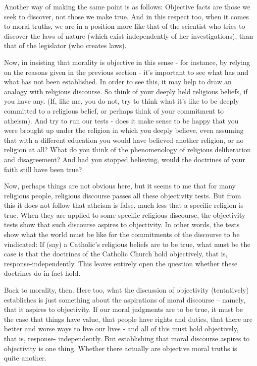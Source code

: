Another way of making the same point is as follows: Objective facts are those we 
seek to discover, not those we make true. And in this respect too, when it comes to 
moral truths, we are in a position more like that of the scientist who tries to discover the 
laws of nature (which exist independently of her investigations), than that of the 
legislator (who creates laws).  

Now, in insisting that morality is objective in this sense - for instance, by relying 
on the reasons given in the previous section - it's important to see what has and what 
has not been established. In order to see this, it may help to draw an analogy with 
religious discourse. So think of your deeply held religious beliefs, if you have any. (If, like 
me, you do not, try to think what it's like to be deeply committed to a religious belief, or 
perhaps think of your commitment to atheism). And try to run our tests - does it make
sense to be happy that you were brought up under the religion in which you deeply 
believe, even assuming that with a different education you would have believed another 
religion, or no religion at all?  What do you think of the phenomenology of religious 
deliberation and disagreement? And had you stopped believing, would the doctrines of 
your faith still have been true?  

Now, perhaps things are not obvious here, but it seems to me that for many 
religious people, religious discourse passes all these objectivity tests. But from this it 
does not follow that atheism is false, much less that a specific religion is true. When 
they are applied to some specific religious discourse, the objectivity tests show that such 
discourse aspires to objectivity. In other words, the tests show what the world must be 
like for the commitments of the discourse to be vindicated: If (say) a Catholic's religious 
beliefs are to be true, what must be the case is that the doctrines of the Catholic Church 
hold objectively, that is, response-independently. This leaves entirely open the question 
whether these doctrines do in fact hold.  

Back to morality, then. Here too, what the discussion of objectivity (tentatively) 
establishes is just something about the aspirations of moral discourse – namely, that it 
aspires to objectivity. If our moral judgments are to be true, it must be the case that 
things have value, that people have rights and duties, that there are better and worse 
ways to live our lives - and all of this must hold objectively, that is, response-
independently. But establishing that moral discourse aspires to objectivity is one thing. 
Whether there actually are objective moral truths is quite another.

